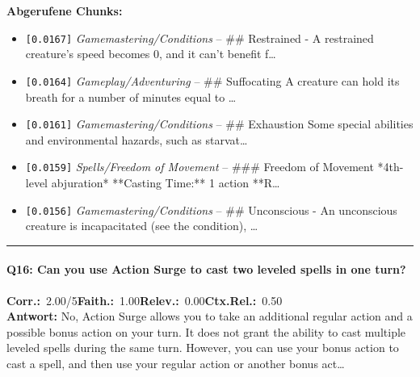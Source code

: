 \noindent\textbf{Abgerufene Chunks:}
\begin{itemize}[noitemsep, topsep=2pt]
  \item[\textbf{\#1}] \texttt{[0.0167]} \textit{Gamemastering/Conditions} -- \#\# Restrained  - A restrained creature's speed becomes 0, and it can't benefit f\ldots
  \item[\textbf{\#2}] \texttt{[0.0164]} \textit{Gameplay/Adventuring} -- \#\# Suffocating  A creature can hold its breath for a number of minutes equal to \ldots
  \item[\textbf{\#3}] \texttt{[0.0161]} \textit{Gamemastering/Conditions} -- \#\# Exhaustion  Some special abilities and environmental hazards, such as starvat\ldots
  \item[\textbf{\#4}] \texttt{[0.0159]} \textit{Spells/Freedom of Movement} -- \#\#\# Freedom of Movement  *4th-level abjuration*  **Casting Time:** 1 action  **R\ldots
  \item[\textbf{\#5}] \texttt{[0.0156]} \textit{Gamemastering/Conditions} -- \#\# Unconscious  - An unconscious creature is incapacitated (see the condition), \ldots
\end{itemize}
\vspace{4pt}
\hrule
\vspace{6pt}

\paragraph{Q16: Can you use Action Surge to cast two leveled spells in one turn?}
\noindent \textbf{Corr.:}~2.00/5\quad \textbf{Faith.:}~1.00\quad \textbf{Relev.:}~0.00\quad \textbf{Ctx.Rel.:}~0.50\\

\noindent\textbf{Antwort:} No, Action Surge allows you to take an additional regular action and a possible bonus action on your turn. It does not grant the ability to cast multiple leveled spells during the same turn. However, you can use your bonus action to cast a spell, and then use your regular action or another bonus act\ldots

